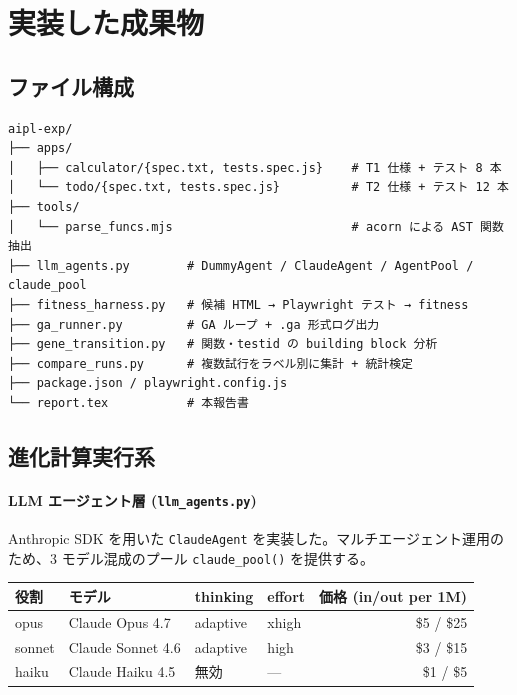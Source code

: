 \documentclass[a4paper,11pt]{ltjsarticle}
\begin{document}
\section{実装した成果物}

\subsection{ファイル構成}

\begin{lstlisting}
aipl-exp/
├── apps/
│   ├── calculator/{spec.txt, tests.spec.js}    # T1 仕様 + テスト 8 本
│   └── todo/{spec.txt, tests.spec.js}          # T2 仕様 + テスト 12 本
├── tools/
│   └── parse_funcs.mjs                         # acorn による AST 関数抽出
├── llm_agents.py        # DummyAgent / ClaudeAgent / AgentPool / claude_pool
├── fitness_harness.py   # 候補 HTML → Playwright テスト → fitness
├── ga_runner.py         # GA ループ + .ga 形式ログ出力
├── gene_transition.py   # 関数・testid の building block 分析
├── compare_runs.py      # 複数試行をラベル別に集計 + 統計検定
├── package.json / playwright.config.js
└── report.tex           # 本報告書
\end{lstlisting}

\subsection{進化計算実行系}

\paragraph{LLM エージェント層 (\texttt{llm\_agents.py})}
Anthropic SDK を用いた \texttt{ClaudeAgent} を実装した。マルチエージェント運用のため、3 モデル混成のプール \texttt{claude\_pool()} を提供する。

\begin{center}
\begin{tabular}{@{}llll r@{}}
\toprule
役割 & モデル & thinking & effort & 価格 (in/out per 1M)\\
\midrule
opus   & Claude Opus 4.7   & adaptive & xhigh & \$5 / \$25 \\
sonnet & Claude Sonnet 4.6 & adaptive & high  & \$3 / \$15 \\
haiku  & Claude Haiku 4.5  & 無効     & ---   & \$1 / \$5  \\
\bottomrule
\end{tabular}
\end{center}
\end{document}
